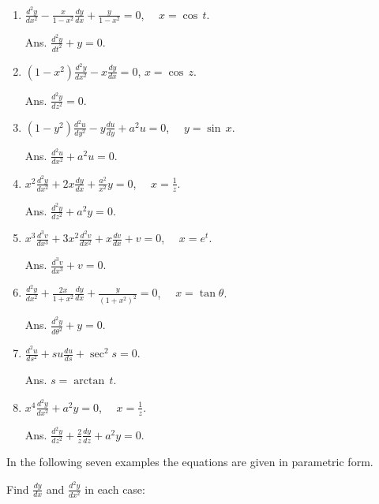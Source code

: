 \begin{enumerate}
\addtocounter{enumi}{7}


\item
$\frac{d^2 y}{dx^2} - \frac{x}{1 - x^2} \frac{dy}{dx} 
+ \frac{y}{1 - x^2} = 0$, \ \ $x = \cos\, t$.

Ans. 	
$\frac{d^2 y}{dt^2} + y = 0$.

\item
$(1 - x^2) \frac{d^2 y}{dx^2} - x \frac{dy}{dx} = 0$, 	
$x = \cos\, z$. 

Ans. $\frac{d^2 y}{dz^2} = 0$.

\item
$(1 - y^2) \frac{d^2 u}{dy^2} - y \frac{du}{dy} + a^2 u = 0$,
\ \ $y = \sin\, x$. 

Ans. $\frac{d^2 u}{dx^2} + a^2 u = 0$.

\item
$x^2 \frac{d^2 y}{dx^2} + 2x \frac{dy}{dx} + \frac{a^2}{x^2} y = 0$,
\ \ $x = \frac{1}{z}$.

Ans. $ 	\frac{d^2 y}{dz^2} + a^2 y = 0$.

\item
$x^3 \frac{d^3 v}{dx^3} + 3x^2 \frac{d^2 v}{dx^2} 
+ x \frac{dv}{dx} + v = 0$, \ \ $x = e^t$. 

Ans. $	\frac{d^3 v}{dx^3} + v = 0$.

\item
$\frac{d^2 y}{dx^2} + \frac{2x}{1 + x^2} \frac{dy}{dx} 
+ \frac{y}{(1 + x^2)^2} = 0$, \ \ $x = \tan\theta$. 

Ans. $\frac{d^2 y}{d\theta^2} + y = 0$.

\item
$\frac{d^2 u}{ds^2} + su \frac{du}{ds} + \sec^2 s = 0$.

Ans. $s = \arctan\, t$.

\item
$x^4 \frac{d^2 y}{dx^2} + a^2 y = 0$, \ \ $x = \frac{1}{z}$. 	

Ans. $\frac{d^2 y}{dz^2} + \frac{2}{z} \frac{dy}{dz} + a^2 y = 0$.

\end{enumerate}

In the following seven examples the equations are given in parametric form.

Find $\frac{dy}{dx}$ and $\frac{d^2 y}{dx^2}$ in each case:

